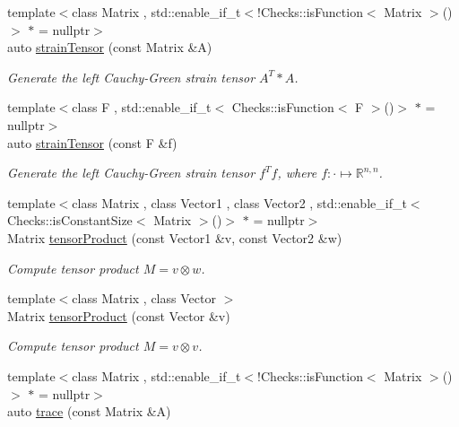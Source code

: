 \begin{DoxyCompactItemize}
{\footnotesize template$<$class Matrix , std\-::enable\-\_\-if\-\_\-t$<$!\-Checks\-::is\-Function$<$ Matrix $>$()$>$ $\ast$  = nullptr$>$ }\\auto \hyperlink{namespaceFunG_1_1LinearAlgebra_a0e10030a723fad88f5f4f0b6612c393a}{strain\-Tensor} (const \-Matrix \&\-A)
\begin{DoxyCompactList}\small\item\em \-Generate the left \-Cauchy-\/\-Green strain tensor $A^T*A$. \end{DoxyCompactList}\item 
{\footnotesize template$<$class F , std\-::enable\-\_\-if\-\_\-t$<$ Checks\-::is\-Function$<$ F $>$()$>$ $\ast$  = nullptr$>$ }\\auto \hyperlink{namespaceFunG_1_1LinearAlgebra_ab4371788da401ca62a3a29a13cf8d4ce}{strain\-Tensor} (const \-F \&f)
\begin{DoxyCompactList}\small\item\em \-Generate the left \-Cauchy-\/\-Green strain tensor $f^Tf$, where $f:\cdot\mapsto\mathbb{R}^{n,n} $. \end{DoxyCompactList}\item 
{\footnotesize template$<$class Matrix , class Vector1 , class Vector2 , std\-::enable\-\_\-if\-\_\-t$<$ Checks\-::is\-Constant\-Size$<$ Matrix $>$()$>$ $\ast$  = nullptr$>$ }\\\-Matrix \hyperlink{group__LinearAlgebraGroup_ga5d0e066e6184fb3324d96d20087b5578}{tensor\-Product} (const \-Vector1 \&v, const \-Vector2 \&w)
\begin{DoxyCompactList}\small\item\em \-Compute tensor product $ M = v \otimes w $. \end{DoxyCompactList}\item 
{\footnotesize template$<$class Matrix , class Vector $>$ }\\\-Matrix \hyperlink{group__LinearAlgebraGroup_gae5e82b9e66319511dae5ff0d9304a6b7}{tensor\-Product} (const \-Vector \&v)
\begin{DoxyCompactList}\small\item\em \-Compute tensor product $ M = v \otimes v $. \end{DoxyCompactList}\item 
{\footnotesize template$<$class Matrix , std\-::enable\-\_\-if\-\_\-t$<$!\-Checks\-::is\-Function$<$ Matrix $>$()$>$ $\ast$  = nullptr$>$ }\\auto \hyperlink{group__LinearAlgebraGroup_ga4d73eb4d46dd9196a31e2d6d557d509e}{trace} (const \-Matrix \&\-A)

\end{DoxyCompactItemize}

